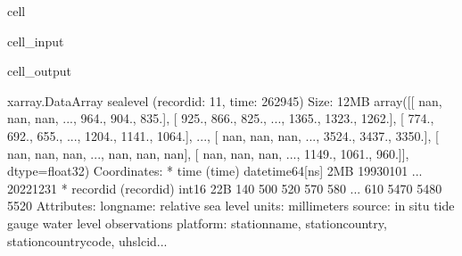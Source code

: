 \documentclass[letterpaper,10pt,english]{jupyterBook}
\begin{document}
\begin{sphinxuseclass}{cell}\begin{sphinxVerbatimInput}

\begin{sphinxuseclass}{cell_input}
\begin{sphinxVerbatim}[commandchars=\\\{\}]
\end{sphinxVerbatim}

\end{sphinxuseclass}\end{sphinxVerbatimInput}
\begin{sphinxVerbatimOutput}

\begin{sphinxuseclass}{cell_output}
\begin{sphinxVerbatim}[commandchars=\\\{\}]
\PYGZlt{}xarray.DataArray \PYGZsq{}sea\PYGZus{}level\PYGZsq{} (record\PYGZus{}id: 11, time: 262945)\PYGZgt{} Size: 12MB
array([[  nan,   nan,   nan, ...,  964.,  904.,  835.],
       [ 925.,  866.,  825., ..., 1365., 1323., 1262.],
       [ 774.,  692.,  655., ..., 1204., 1141., 1064.],
       ...,
       [  nan,   nan,   nan, ..., 3524., 3437., 3350.],
       [  nan,   nan,   nan, ...,   nan,   nan,   nan],
       [  nan,   nan,   nan, ..., 1149., 1061.,  960.]], dtype=float32)
Coordinates:
  * time       (time) datetime64[ns] 2MB 1993\PYGZhy{}01\PYGZhy{}01 ... 2022\PYGZhy{}12\PYGZhy{}31
  * record\PYGZus{}id  (record\PYGZus{}id) int16 22B 140 500 520 570 580 ... 610 5470 5480 5520
Attributes:
    long\PYGZus{}name:  relative sea level
    units:      millimeters
    source:     in situ tide gauge water level observations
    platform:   station\PYGZus{}name, station\PYGZus{}country, station\PYGZus{}country\PYGZus{}code, uhslc\PYGZus{}id...
\end{sphinxVerbatim}

\end{sphinxuseclass}\end{sphinxVerbatimOutput}

\end{sphinxuseclass}
\end{document}
